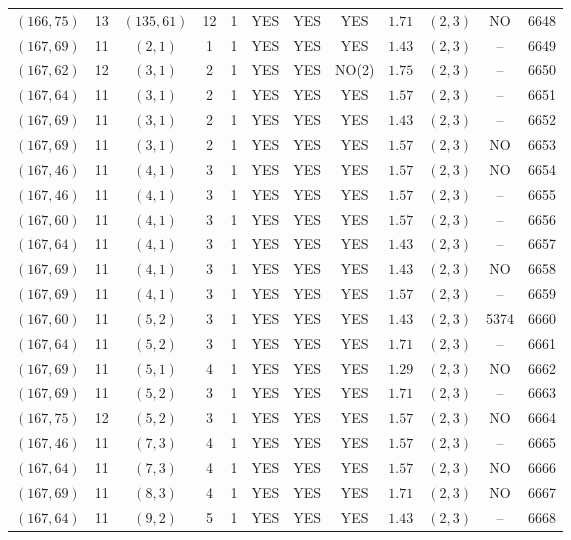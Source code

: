 \begin{longtable}{|c|c|c|c|c|c|c|c|c|c|c|c|}
$(166,75)$ & 13 & $(135,61)$ & 12 & 1 & YES & YES & YES & $1.71$ & $(2,3)$ & NO & 6648\\
$(167,69)$ & 11 & $(2,1)$ & 1 & 1 & YES & YES & YES & $1.43$ & $(2,3)$ & -- & 6649\\
$(167,62)$ & 12 & $(3,1)$ & 2 & 1 & YES & YES & NO(2) & $1.75$ & $(2,3)$ & -- & 6650\\
$(167,64)$ & 11 & $(3,1)$ & 2 & 1 & YES & YES & YES & $1.57$ & $(2,3)$ & -- & 6651\\
$(167,69)$ & 11 & $(3,1)$ & 2 & 1 & YES & YES & YES & $1.43$ & $(2,3)$ & -- & 6652\\
$(167,69)$ & 11 & $(3,1)$ & 2 & 1 & YES & YES & YES & $1.57$ & $(2,3)$ & NO & 6653\\
$(167,46)$ & 11 & $(4,1)$ & 3 & 1 & YES & YES & YES & $1.57$ & $(2,3)$ & NO & 6654\\
$(167,46)$ & 11 & $(4,1)$ & 3 & 1 & YES & YES & YES & $1.57$ & $(2,3)$ & -- & 6655\\
$(167,60)$ & 11 & $(4,1)$ & 3 & 1 & YES & YES & YES & $1.57$ & $(2,3)$ & -- & 6656\\
$(167,64)$ & 11 & $(4,1)$ & 3 & 1 & YES & YES & YES & $1.43$ & $(2,3)$ & -- & 6657\\
$(167,69)$ & 11 & $(4,1)$ & 3 & 1 & YES & YES & YES & $1.43$ & $(2,3)$ & NO & 6658\\
$(167,69)$ & 11 & $(4,1)$ & 3 & 1 & YES & YES & YES & $1.57$ & $(2,3)$ & -- & 6659\\
$(167,60)$ & 11 & $(5,2)$ & 3 & 1 & YES & YES & YES & $1.43$ & $(2,3)$ & 5374 & 6660\\
$(167,64)$ & 11 & $(5,2)$ & 3 & 1 & YES & YES & YES & $1.71$ & $(2,3)$ & -- & 6661\\
$(167,69)$ & 11 & $(5,1)$ & 4 & 1 & YES & YES & YES & $1.29$ & $(2,3)$ & NO & 6662\\
$(167,69)$ & 11 & $(5,2)$ & 3 & 1 & YES & YES & YES & $1.71$ & $(2,3)$ & -- & 6663\\
$(167,75)$ & 12 & $(5,2)$ & 3 & 1 & YES & YES & YES & $1.57$ & $(2,3)$ & NO & 6664\\
$(167,46)$ & 11 & $(7,3)$ & 4 & 1 & YES & YES & YES & $1.57$ & $(2,3)$ & -- & 6665\\
$(167,64)$ & 11 & $(7,3)$ & 4 & 1 & YES & YES & YES & $1.57$ & $(2,3)$ & NO & 6666\\
$(167,69)$ & 11 & $(8,3)$ & 4 & 1 & YES & YES & YES & $1.71$ & $(2,3)$ & NO & 6667\\
$(167,64)$ & 11 & $(9,2)$ & 5 & 1 & YES & YES & YES & $1.43$ & $(2,3)$ & -- & 6668\\

\end{longtable}
